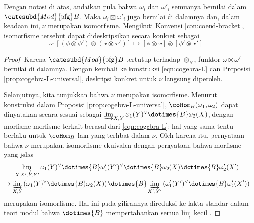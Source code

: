 \begin{lemma}
	Dengan notasi di atas, andaikan pula bahwa $\omega_i$ dan $\omega'_i$ semuanya bernilai dalam $\catesubd{Mod}{\mathrm{pfg}}B$. Maka $\omega_i \boxtimes \omega'_i$ juga bernilai di dalamnya dan, dalam keadaan ini, $\nu$ merupakan isomorfisme. Mengikuti Konvensi \ref{con:coend-bracket}, isomorfisme tersebut dapat dideskripsikan secara konkret sebagai
	\begin{equation*}
		\nu: \left[ (\phi \otimes \phi') \otimes (x \otimes x') \right] \mapsto [\phi \otimes x] \otimes [\phi' \otimes x'].
	\end{equation*}
\end{lemma}
\begin{proof}
	Karena $\catesubd{Mod}{\mathrm{pfg}}B$ tertutup terhadap $\otimes_B$, funktor $\omega \boxtimes \omega'$ bernilai di dalamnya. Dengan kembali ke konstruksi \eqref{eqn:cogebra-L} dan Proposisi \ref{prop:cogebra-L-universal}, deskripsi konkret untuk $\nu$ langsung diperoleh.
	
	Selanjutnya, kita tunjukkan bahwa $\nu$ merupakan isomorfisme. Menurut konstruksi dalam Proposisi \ref{prop:cogebra-L-universal}, $\coHom_B(\omega_1, \omega_2)$ dapat dinyatakan secara sesuai sebagai $\varinjlim_{X, Y} \omega_1(Y)^\vee \dotimes{B} \omega_2(X)$, dengan morfisme-morfisme terkait berasal dari \eqref{eqn:cogebra-L}; hal yang sama tentu berlaku untuk $\coHom_B$ lain yang terlibat dalam $\nu$. Oleh karena itu, pernyataan bahwa $\nu$ merupakan isomorfisme ekuivalen dengan pernyataan bahwa morfisme yang jelas
	\begin{multline*}
		\varinjlim_{X, X', Y, Y'} \omega_1(Y)^\vee \dotimes{B} \omega'_1(Y')^\vee \dotimes{B} \omega_2(X) \dotimes{B} \omega'_2(X') \\
		\to \varinjlim_{X, Y} \left( \omega_1(Y)^\vee \dotimes{B} \omega_2(X) \right) \dotimes{B} \varinjlim_{X', Y'} \left( \omega'_1(Y')^\vee \dotimes{B} \omega'_2(X') \right)
	\end{multline*}
	merupakan isomorfisme. Hal ini pada gilirannya direduksi ke fakta standar dalam teori modul bahwa $\dotimes{B}$ mempertahankan semua $\varinjlim$ kecil \cite[Proposisi 6.9.2]{Li1}.
\end{proof}

